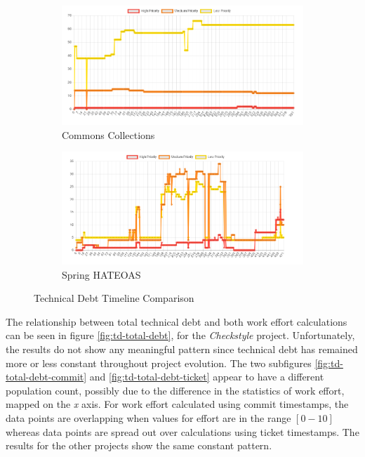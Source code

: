 \documentclass{mpaper}
\begin{document}
\begin{figure}
	\centering
	\begin{subfigure}{.45\textwidth}
		\includegraphics[width=\linewidth]{images/collections_td_timeline.png}
		\caption{Commons Collections}
		\label{fig:collections-td-timeline}
	\end{subfigure}
	\begin{subfigure}{.45\textwidth}
		\includegraphics[width=\linewidth]{images/spring_td_timeline.png}
		\caption{Spring HATEOAS}
		\label{fig:spring-td-timeline}
	\end{subfigure}
	\caption{Technical Debt Timeline Comparison}
	\label{fig:td-timeline}
\end{figure}

The relationship between total technical debt and both work effort calculations
can be seen in figure \ref{fig:td-total-debt}, for the \emph{Checkstyle}
project. Unfortunately, the results do not show any meaningful pattern since
technical debt has remained more or less constant throughout project evolution.
The two subfigures \ref{fig:td-total-debt-commit} and
\ref{fig:td-total-debt-ticket} appear to have a different population count,
possibly due to the difference in the statistics of work effort, mapped on the
\emph{x} axis. For work effort calculated using commit timestamps, the data
points are overlapping when values for effort are in the range $[0-10]$ whereas
data points are spread out over calculations using ticket timestamps. The
results for the other projects show the same constant pattern. 
\end{document}
